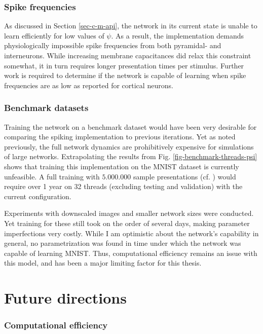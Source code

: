 \subsubsection*{Spike frequencies}

As discussed in Section \ref{sec-c-m-api}, the network in its current state is unable to learn efficiently for low
values of $\psi$. As a result, the implementation demands physiologically impossible spike frequencies from both
pyramidal- and interneurons. While increasing membrane capacitances did relax this constraint somewhat, it in turn
requires longer presentation times per stimulus. Further work is required to determine if the network is capable of
learning when spike frequencies are as low as reported for cortical neurons.

\subsubsection*{Benchmark datasets}

Training the network on a benchmark dataset would have been very desirable for comparing the spiking implementation to
previous iterations. Yet as noted previously, the full network dynamics are prohibitively expensive for simulations of
large networks. Extrapolating the results from Fig. \ref{fig-benchmark-threads-psi} shows that training this
implementation on the MNIST dataset is currently unfeasible. A full training with $5.000.000$ sample presentations (cf.
\cite{Haider2021}) would require over 1 year on 32 threads (excluding testing and validation) with the current
configuration.

Experiments with downscaled images and smaller network sizes were conducted. Yet training for these still took on the
order of several days, making parameter imperfections very costly. While I am optimistic about the network's capability
in general, no parametrization was found in time under which the network was capable of learning MNIST. Thus,
computational efficiency remains an issue with this model, and has been a major limiting factor for this thesis.


\section{Future directions}

\subsubsection*{Computational efficiency}

